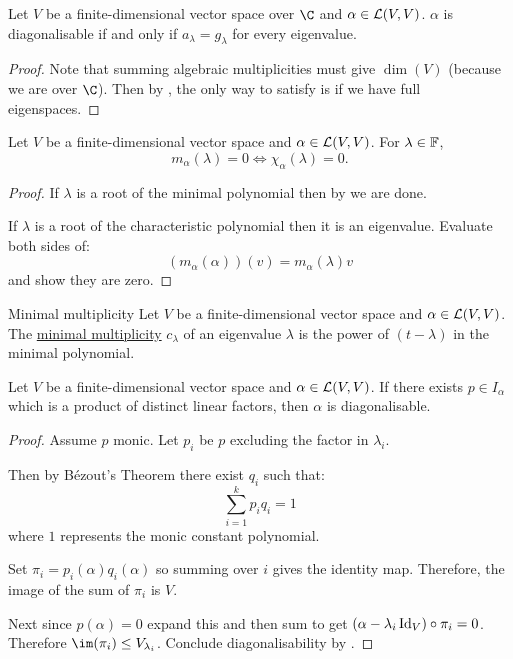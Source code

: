 \documentclass[../Main.tex]{subfiles}
\begin{document}
\begin{proposition}
    Let $V$ be a finite-dimensional vector space over $\C$ and $\alpha \in \mathcal{L}(V, V)$. $\alpha$ is diagonalisable if and only if $a_\lambda = g_\lambda$ for every eigenvalue.
    \label{propDiagIffFullESpaces}
\end{proposition}
\begin{proof}
    Note that summing algebraic multiplicities must give $\dim(V)$ (because we are over $\C$). Then by , the only way to satisfy  is if we have full eigenspaces.
\end{proof}
\begin{lemma}
    Let $V$ be a finite-dimensional vector space and $\alpha \in \mathcal{L}(V, V)$. For $\lambda \in \mathbb{F}$,
    \begin{equation*}
        m_\alpha(\lambda) = 0 \iff \chi_\alpha(\lambda) = 0.
    \end{equation*}
    \label{lemMinCharSameRoots}
\end{lemma}
\begin{proof}
    If $\lambda$ is a root of the minimal polynomial then by  we are done.

    If $\lambda$ is a root of the characteristic polynomial then it is an eigenvalue. Evaluate both sides of:
    \begin{equation*}
        (m_\alpha(\alpha))(v) = m_\alpha(\lambda)v
    \end{equation*}
    and show they are zero.
\end{proof}
\begin{definition}{Minimal multiplicity}
    Let $V$ be a finite-dimensional vector space and $\alpha \in \mathcal{L}(V, V)$. The \underline{minimal multiplicity} $c_\lambda$ of an eigenvalue $\lambda$ is the power of $(t - \lambda)$ in the minimal polynomial.
\end{definition}
\begin{theorem}
    Let $V$ be a finite-dimensional vector space and $\alpha \in \mathcal{L}(V, V)$. If there exists $p \in I_\alpha$ which is a product of distinct linear factors, then $\alpha$ is diagonalisable.
    \label{thmDiagIfLinearFactors}
\end{theorem}
\begin{proof}
    Assume $p$ monic. Let $p_i$ be $p$ excluding the factor in $\lambda_i$.

    Then by B\'ezout's Theorem there exist $q_i$ such that:
    \begin{equation*}
        \sum_{i=1}^k p_i q_i = 1
    \end{equation*}
    where $1$ represents the monic constant polynomial.

    Set $\pi_i = p_i(\alpha) q_i(\alpha)$ so summing over $i$ gives the identity map. Therefore, the image of the sum of $\pi_i$ is $V$.

    Next since $p(\alpha) = 0$ expand this and then sum to get $(\alpha - \lambda_i \operatorname{Id}_V) \circ \pi_i = 0$. Therefore $\im(\pi_i) \leq V_{\lambda_i}$. Conclude diagonalisability by .
\end{proof}
\end{document}
